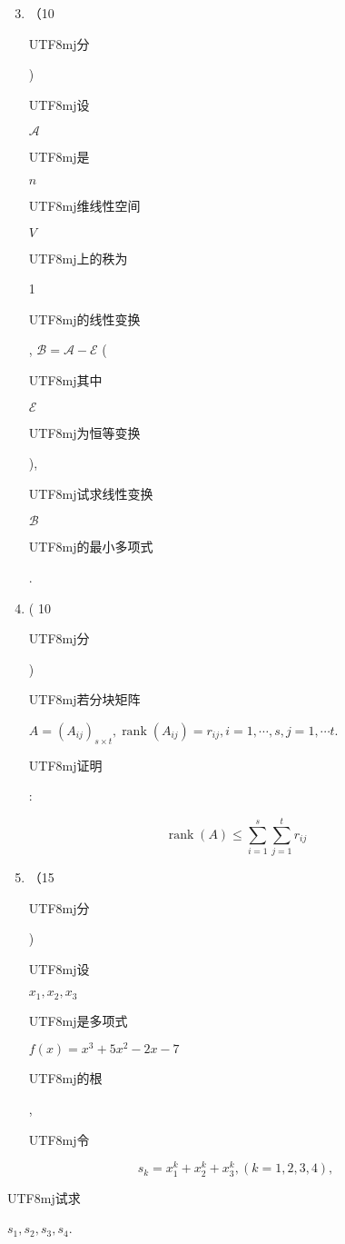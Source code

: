 \documentclass[10pt]{article}
\begin{document}
\begin{enumerate}
  \setcounter{enumi}{2}
  \item （10 \begin{CJK}{UTF8}{mj}分\end{CJK}) \begin{CJK}{UTF8}{mj}设\end{CJK} $\mathcal{A}$ \begin{CJK}{UTF8}{mj}是\end{CJK} $n$ \begin{CJK}{UTF8}{mj}维线性空间\end{CJK} $V$ \begin{CJK}{UTF8}{mj}上的秩为\end{CJK} 1 \begin{CJK}{UTF8}{mj}的线性变换\end{CJK}, $\mathcal{B}=\mathcal{A}-\mathcal{E}$ (\begin{CJK}{UTF8}{mj}其中\end{CJK} $\mathcal{E}$ \begin{CJK}{UTF8}{mj}为恒等变换\end{CJK}), \begin{CJK}{UTF8}{mj}试求线性变换\end{CJK} $\mathcal{B}$ \begin{CJK}{UTF8}{mj}的最小多项式\end{CJK}.

  \item ( 10 \begin{CJK}{UTF8}{mj}分\end{CJK}) \begin{CJK}{UTF8}{mj}若分块矩阵\end{CJK} $A=\left(A_{i j}\right)_{s \times t}, \operatorname{rank}\left(A_{i j}\right)=r_{i j}, i=1, \cdots, s, j=1, \cdots t$. \begin{CJK}{UTF8}{mj}证明\end{CJK}:

\end{enumerate}
$$
\operatorname{rank}(A) \leq \sum_{i=1}^{s} \sum_{j=1}^{t} r_{i j}
$$

\begin{enumerate}
  \setcounter{enumi}{4}
  \item （15 \begin{CJK}{UTF8}{mj}分\end{CJK}) \begin{CJK}{UTF8}{mj}设\end{CJK} $x_{1}, x_{2}, x_{3}$ \begin{CJK}{UTF8}{mj}是多项式\end{CJK} $f(x)=x^{3}+5 x^{2}-2 x-7$ \begin{CJK}{UTF8}{mj}的根\end{CJK}, \begin{CJK}{UTF8}{mj}令\end{CJK}
\end{enumerate}
$$
s_{k}=x_{1}^{k}+x_{2}^{k}+x_{3}^{k},(k=1,2,3,4),
$$
\begin{CJK}{UTF8}{mj}试求\end{CJK} $s_{1}, s_{2}, s_{3}, s_{4}$.
\end{document}
